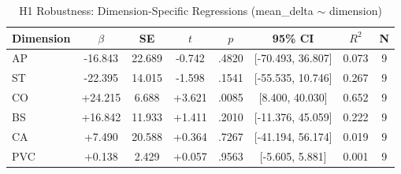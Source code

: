 \begin{table}[ht]
\centering
\caption{H1 Robustness: Dimension-Specific Regressions (mean\_delta $\sim$ dimension)}
\label{tab:h1-dim-robustness}
\begin{tabular}{lccccccc}
\toprule
Dimension & $\beta$ & SE & $t$ & $p$ & 95\% CI & $R^2$ & N \\
\midrule
AP & -16.843 & 22.689 & -0.742 & .4820 & [-70.493, 36.807] & 0.073 & 9 \\
ST & -22.395 & 14.015 & -1.598 & .1541 & [-55.535, 10.746] & 0.267 & 9 \\
CO & +24.215 & 6.688 & +3.621 & .0085 & [8.400, 40.030] & 0.652 & 9 \\
BS & +16.842 & 11.933 & +1.411 & .2010 & [-11.376, 45.059] & 0.222 & 9 \\
CA & +7.490 & 20.588 & +0.364 & .7267 & [-41.194, 56.174] & 0.019 & 9 \\
PVC & +0.138 & 2.429 & +0.057 & .9563 & [-5.605, 5.881] & 0.001 & 9 \\
\bottomrule
\end{tabular}
\end{table}
